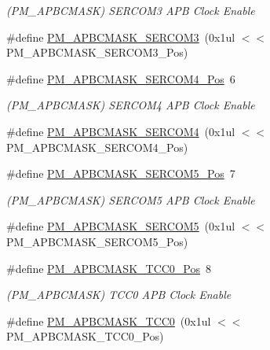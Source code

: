 \begin{DoxyCompactItemize}
\begin{DoxyCompactList}\small\item\em (P\+M\+\_\+\+A\+P\+B\+C\+M\+A\+SK) S\+E\+R\+C\+O\+M3 A\+PB Clock Enable \end{DoxyCompactList}\item 
\#define \mbox{\hyperlink{group___s_a_m_d21___p_m_ga2bf65be68fb589feba7904e81b19a721}{P\+M\+\_\+\+A\+P\+B\+C\+M\+A\+S\+K\+\_\+\+S\+E\+R\+C\+O\+M3}}~(0x1ul $<$$<$ P\+M\+\_\+\+A\+P\+B\+C\+M\+A\+S\+K\+\_\+\+S\+E\+R\+C\+O\+M3\+\_\+\+Pos)
\item 
\#define \mbox{\hyperlink{group___s_a_m_d21___p_m_ga45ed05799a33a5f26c3b1cda9b8b8426}{P\+M\+\_\+\+A\+P\+B\+C\+M\+A\+S\+K\+\_\+\+S\+E\+R\+C\+O\+M4\+\_\+\+Pos}}~6
\begin{DoxyCompactList}\small\item\em (P\+M\+\_\+\+A\+P\+B\+C\+M\+A\+SK) S\+E\+R\+C\+O\+M4 A\+PB Clock Enable \end{DoxyCompactList}\item 
\#define \mbox{\hyperlink{group___s_a_m_d21___p_m_ga15a25af928ffa94647895e273459fcf5}{P\+M\+\_\+\+A\+P\+B\+C\+M\+A\+S\+K\+\_\+\+S\+E\+R\+C\+O\+M4}}~(0x1ul $<$$<$ P\+M\+\_\+\+A\+P\+B\+C\+M\+A\+S\+K\+\_\+\+S\+E\+R\+C\+O\+M4\+\_\+\+Pos)
\item 
\#define \mbox{\hyperlink{group___s_a_m_d21___p_m_gad2bddb67278a43fe7140447e6aa00722}{P\+M\+\_\+\+A\+P\+B\+C\+M\+A\+S\+K\+\_\+\+S\+E\+R\+C\+O\+M5\+\_\+\+Pos}}~7
\begin{DoxyCompactList}\small\item\em (P\+M\+\_\+\+A\+P\+B\+C\+M\+A\+SK) S\+E\+R\+C\+O\+M5 A\+PB Clock Enable \end{DoxyCompactList}\item 
\#define \mbox{\hyperlink{group___s_a_m_d21___p_m_gaaca811fdba4b1dfaa4d1c6115eb92110}{P\+M\+\_\+\+A\+P\+B\+C\+M\+A\+S\+K\+\_\+\+S\+E\+R\+C\+O\+M5}}~(0x1ul $<$$<$ P\+M\+\_\+\+A\+P\+B\+C\+M\+A\+S\+K\+\_\+\+S\+E\+R\+C\+O\+M5\+\_\+\+Pos)
\item 
\#define \mbox{\hyperlink{group___s_a_m_d21___p_m_ga1f99397607c4af2438bd07b0cefb9b1a}{P\+M\+\_\+\+A\+P\+B\+C\+M\+A\+S\+K\+\_\+\+T\+C\+C0\+\_\+\+Pos}}~8
\begin{DoxyCompactList}\small\item\em (P\+M\+\_\+\+A\+P\+B\+C\+M\+A\+SK) T\+C\+C0 A\+PB Clock Enable \end{DoxyCompactList}\item 
\#define \mbox{\hyperlink{group___s_a_m_d21___p_m_ga45cb1bca3a278d7978161fdb6f8aeb37}{P\+M\+\_\+\+A\+P\+B\+C\+M\+A\+S\+K\+\_\+\+T\+C\+C0}}~(0x1ul $<$$<$ P\+M\+\_\+\+A\+P\+B\+C\+M\+A\+S\+K\+\_\+\+T\+C\+C0\+\_\+\+Pos)

\end{DoxyCompactItemize}
